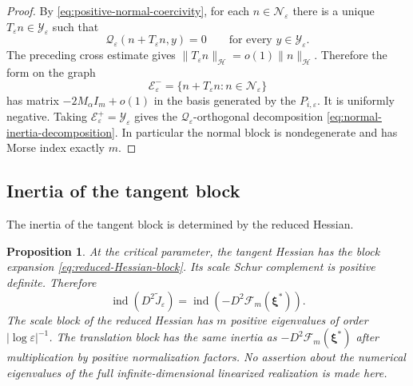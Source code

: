 \documentclass[11pt]{article}
\newtheorem{proposition}[theorem]{Proposition}
\numberwithin{equation}{section}
\begin{document}
\begin{proof}
By \eqref{eq:positive-normal-coercivity}, for each
$n\in\mathcal N_\varepsilon$ there is a unique
$T_\varepsilon n\in\mathcal Y_\varepsilon$ such that
\[
\mathcal Q_\varepsilon(n+T_\varepsilon n,y)=0
\qquad\text{for every }y\in\mathcal Y_\varepsilon.
\]
The preceding cross estimate gives
$\|T_\varepsilon n\|_{\mathcal H}=o(1)
\|n\|_{\mathcal H}$. Therefore the form on the graph
\[
\mathcal E_\varepsilon^-
=\{n+T_\varepsilon n:n\in\mathcal N_\varepsilon\}
\]
has matrix $-2M_\alpha I_m+o(1)$ in the basis generated by the
$P_{i,\varepsilon}$. It is uniformly negative. Taking
$\mathcal E_\varepsilon^+=\mathcal Y_\varepsilon$ gives the
$\mathcal Q_\varepsilon$-orthogonal decomposition
\eqref{eq:normal-inertia-decomposition}. In particular the normal
block is nondegenerate and has Morse index exactly $m$.
\end{proof}

\subsection{Inertia of the tangent block}

The inertia of the tangent block is determined by the reduced Hessian.

\begin{proposition}\label{prop:tangent-inertia}
At the critical parameter, the tangent Hessian has the block expansion
\eqref{eq:reduced-Hessian-block}. Its scale Schur complement is positive definite. Therefore
\begin{equation}\label{eq:tangent-index}
\operatorname{ind}
(D^2\widetilde J_\varepsilon)
=\operatorname{ind}
(-D^2\mathcal F_m(\boldsymbol\xi^*)).
\end{equation}
The scale block of the reduced Hessian has $m$ positive eigenvalues
of order $|\log\varepsilon|^{-1}$. The translation block has the
same inertia as $-D^2\mathcal F_m(\boldsymbol\xi^*)$ after
multiplication by positive normalization factors. No assertion about
the numerical eigenvalues of the full infinite-dimensional
linearized realization is made here.
\end{proposition}
\end{document}
